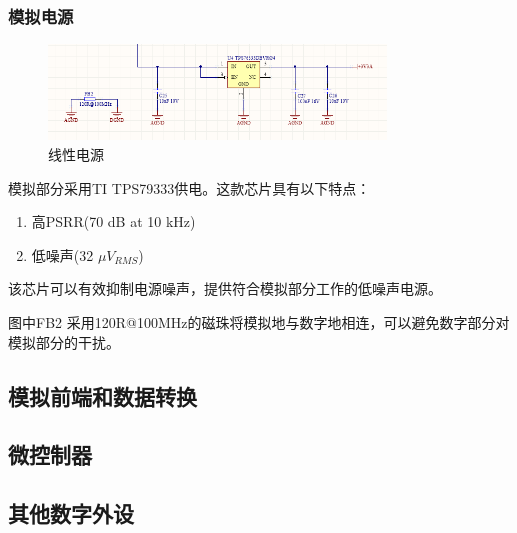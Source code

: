 \documentclass[16pt,a4paper]{article}
\begin{document}
\subsubsection{模拟电源}
\begin{figure}[H]
\centering
\includegraphics[width=0.8\textwidth]{power2.png}
\caption{线性电源} 
\end{figure}
模拟部分采用TI TPS79333供电。这款芯片具有以下特点：

\begin{enumerate}
\item 高PSRR(70 dB at 10 kHz)
\item 低噪声(32 $\mu V_{RMS}$)
\end{enumerate}\par
该芯片可以有效抑制电源噪声，提供符合模拟部分工作的低噪声电源。\par
图中FB2 采用120R@100MHz的磁珠将模拟地与数字地相连，可以避免数字部分对模拟部分的干扰。
\subsection{模拟前端和数据转换}


\subsection{微控制器}
\subsection{其他数字外设}
\end{document}
